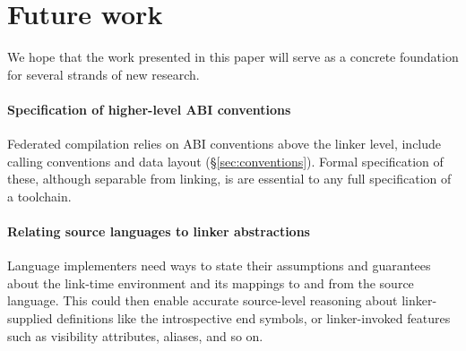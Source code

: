 \documentclass[preprint,10pt]{sigplanconf-pldi16}
\begin{document}
% 

\section{Future work} 
\label{sec:discussion}

We hope that the work presented in this paper will serve as a concrete foundation for several strands of new research.

\paragraph{Specification of higher-level ABI conventions}
Federated compilation relies on ABI conventions above the linker level, include calling conventions and data layout (\S\ref{sec:conventions}).
Formal specification of these, although separable from linking, is are essential to any full specification of a toolchain.


\paragraph{Relating source languages to linker abstractions} 
Language implementers need ways to state their assumptions and guarantees about the link-time environment and its mappings to and from the source language.
This could then enable accurate source-level reasoning about linker-supplied definitions like the introspective \textsf{end} symbols, or linker-invoked features such as visibility attributes, aliases, and so on.
\end{document}
